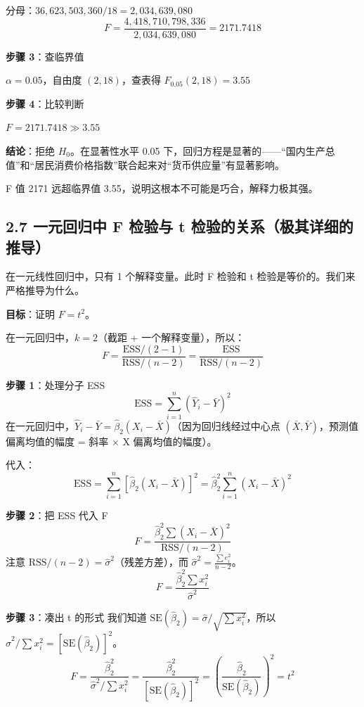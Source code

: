 \documentclass[12pt,a4paper]{ctexart}
\begin{document}
分母：\(36,623,503,360 / 18 = 2,034,639,080\)
\[
F = \frac{4,418,710,798,336}{2,034,639,080} = 2171.7418
\]

\textbf{步骤 3}：查临界值

\(\alpha = 0.05\)，自由度 \((2, 18)\)，查表得 \(F_{0.05}(2, 18) = 3.55\)

\textbf{步骤 4}：比较判断

\(F = 2171.7418 \gg 3.55\)

\textbf{结论}：拒绝 \(H_0\)。在显著性水平 0.05 下，回归方程是显著的——“国内生产总值”和“居民消费价格指数”联合起来对“货币供应量”有显著影响。

F 值 2171 远超临界值 3.55，说明这根本不可能是巧合，解释力极其强。

\subsection{2.7 一元回归中 F 检验与 t 检验的关系（极其详细的推导）}

在一元线性回归中，只有 1 个解释变量。此时 F 检验和 t 检验是等价的。我们来严格推导为什么。

\textbf{目标}：证明 \(F = t^2\)。

在一元回归中，\(k = 2\)（截距 + 一个解释变量），所以：
\[
F = \frac{\text{ESS}/(2-1)}{\text{RSS}/(n-2)} = \frac{\text{ESS}}{\text{RSS}/(n-2)}
\]

\textbf{步骤 1}：处理分子 ESS
\[
\text{ESS} = \sum_{i=1}^{n}(\hat{Y}_i - \bar{Y})^2
\]
在一元回归中，\(\hat{Y}_i - \bar{Y} = \hat{\beta}_2(X_i - \bar{X})\)（因为回归线经过中心点 \((\bar{X}, \bar{Y})\)，预测值偏离均值的幅度 = 斜率 \(\times\) X 偏离均值的幅度）。

代入：
\[
\text{ESS} = \sum_{i=1}^{n}[\hat{\beta}_2(X_i - \bar{X})]^2 = \hat{\beta}_2^2 \sum_{i=1}^{n}(X_i - \bar{X})^2
\]

\textbf{步骤 2}：把 ESS 代入 F
\[
F = \frac{\hat{\beta}_2^2 \sum (X_i - \bar{X})^2}{\text{RSS}/(n-2)}
\]
注意 \(\text{RSS}/(n-2) = \hat{\sigma}^2\)（残差方差），而 \(\hat{\sigma}^2 = \frac{\sum e_i^2}{n-2}\)。
\[
F = \frac{\hat{\beta}_2^2 \sum x_i^2}{\hat{\sigma}^2}
\]

\textbf{步骤 3}：凑出 t 的形式
我们知道 \(\mathrm{SE}(\hat{\beta}_2) = \hat{\sigma} / \sqrt{\sum x_i^2}\)，所以 \(\hat{\sigma}^2 / \sum x_i^2 = [\mathrm{SE}(\hat{\beta}_2)]^2\)。
\begin{equation}
F = \frac{\hat{\beta}_2^2}{\hat{\sigma}^2 / \sum x_i^2} = \frac{\hat{\beta}_2^2}{[\mathrm{SE}(\hat{\beta}_2)]^2} = \left(\frac{\hat{\beta}_2}{\mathrm{SE}(\hat{\beta}_2)}\right)^2 = t^2 \tag{3.47}
\end{equation}
\end{document}
